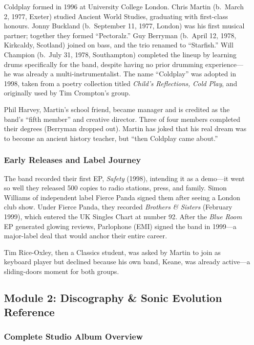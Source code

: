 \documentclass[11pt,letterpaper]{article}
\begin{document}
Coldplay formed in 1996 at University College London. Chris Martin (b.\ March 2, 1977, Exeter) studied Ancient World Studies, graduating with first-class honours. Jonny Buckland (b.\ September 11, 1977, London) was his first musical partner; together they formed ``Pectoralz.'' Guy Berryman (b.\ April 12, 1978, Kirkcaldy, Scotland) joined on bass, and the trio renamed to ``Starfish.'' Will Champion (b.\ July 31, 1978, Southampton) completed the lineup by learning drums specifically for the band, despite having no prior drumming experience---he was already a multi-instrumentalist. The name ``Coldplay'' was adopted in 1998, taken from a poetry collection titled \textit{Child's Reflections, Cold Play}, and originally used by Tim Crompton's group.

Phil Harvey, Martin's school friend, became manager and is credited as the band's ``fifth member'' and creative director. Three of four members completed their degrees (Berryman dropped out). Martin has joked that his real dream was to become an ancient history teacher, but ``then Coldplay came about.''

\subsubsection{Early Releases and Label Journey}

The band recorded their first EP, \textit{Safety} (1998), intending it as a demo---it went so well they released 500 copies to radio stations, press, and family. Simon Williams of independent label Fierce Panda signed them after seeing a London club show. Under Fierce Panda, they recorded \textit{Brothers \& Sisters} (February 1999), which entered the UK Singles Chart at number 92. After the \textit{Blue Room} EP generated glowing reviews, Parlophone (EMI) signed the band in 1999---a major-label deal that would anchor their entire career.

Tim Rice-Oxley, then a Classics student, was asked by Martin to join as keyboard player but declined because his own band, Keane, was already active---a sliding-doors moment for both groups.

\subsection{Module 2: Discography \& Sonic Evolution Reference}

\subsubsection{Complete Studio Album Overview}
\end{document}
